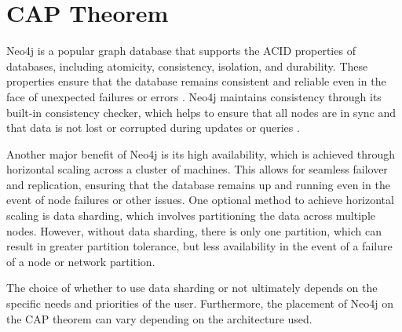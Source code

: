 
\section{CAP Theorem}

Neo4j is a popular graph database that supports the ACID properties of databases, including atomicity, consistency, isolation, and durability. These properties ensure that the database remains consistent and reliable even in the face of unexpected failures or errors \parencite{neo4j:acid}. Neo4j maintains consistency through its built-in consistency checker, which helps to ensure that all nodes are in sync and that data is not lost or corrupted during updates or queries \parencite{neo4j:consistency-checker}.

Another major benefit of Neo4j is its high availability, which is achieved through horizontal scaling across a cluster of machines. This allows for seamless failover and replication, ensuring that the database remains up and running even in the event of node failures or other issues. One optional method to achieve horizontal scaling is data sharding, which involves partitioning the data across multiple nodes. However, without data sharding, there is only one partition, which can result in greater partition tolerance, but less availability in the event of a failure of a node or network partition. \parencite{book:scaling-neo4j}

The choice of whether to use data sharding or not ultimately depends on the specific needs and priorities of the user. Furthermore, the placement of Neo4j on the CAP theorem can vary depending on the architecture used.
